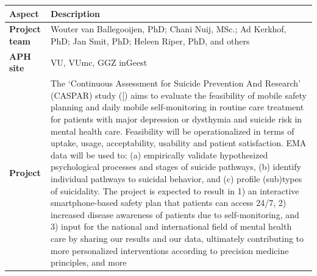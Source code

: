 \documentclass[]{book}
\begin{document}
\begin{longtable}[]{@{}ll@{}}
\toprule
\begin{minipage}[b]{0.25\columnwidth}\raggedright\strut
\textbf{Aspect}\strut
\end{minipage} & \begin{minipage}[b]{0.69\columnwidth}\raggedright\strut
\textbf{Description}\strut
\end{minipage}\tabularnewline
\midrule
\endhead
\begin{minipage}[t]{0.25\columnwidth}\raggedright\strut
\textbf{Project team}\strut
\end{minipage} & \begin{minipage}[t]{0.69\columnwidth}\raggedright\strut
Wouter van Ballegooijen, PhD; Chani Nuij, MSc.; Ad Kerkhof, PhD; Jan
Smit, PhD; Heleen Riper, PhD, and others\strut
\end{minipage}\tabularnewline
\begin{minipage}[t]{0.25\columnwidth}\raggedright\strut
\textbf{APH site}\strut
\end{minipage} & \begin{minipage}[t]{0.69\columnwidth}\raggedright\strut
VU, VUmc, GGZ inGeest\strut
\end{minipage}\tabularnewline
\begin{minipage}[t]{0.25\columnwidth}\raggedright\strut
\textbf{Project}\strut
\end{minipage} & \begin{minipage}[t]{0.69\columnwidth}\raggedright\strut
The `Continuous Assessment for Suicide Prevention And Research' (CASPAR)
study ({[}\citet{Nuij2018}) aims to evaluate the feasibility of mobile
safety planning and daily mobile self-monitoring in routine care
treatment for patients with major depression or dysthymia and suicide
risk in mental health care. Feasibility will be operationalized in terms
of uptake, usage, acceptability, usability and patient satisfaction. EMA
data will be used to: (a) empirically validate hypothesized
psychological processes and stages of suicide pathways, (b) identify
individual pathways to suicidal behavior, and (c) profile (sub)types of
suicidality. The project is expected to result in 1) an interactive
smartphone-based safety plan that patients can access 24/7, 2) increased
disease awareness of patients due to self-monitoring, and 3) input for
the national and international field of mental health care by sharing
our results and our data, ultimately contributing to more personalized
interventions according to precision medicine principles, and more

\end{minipage}
\end{longtable}
\end{document}
